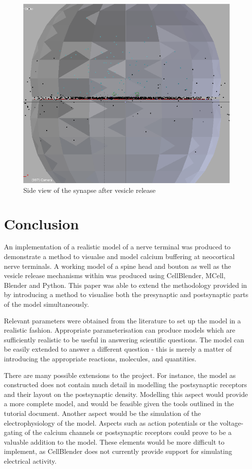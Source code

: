 \documentclass[a4paper]{article}
\begin{document}
\begin{figure}[H]
   \centering
   \includegraphics[scale = 0.4]{side_view.png} %
   \caption{Side view of the synapse after vesicle release}
   \label{fig3}
\end{figure}

\section{Conclusion}
An implementation of a realistic model of a nerve terminal was produced to demonstrate a method to visualse and model calcium buffering at neocortical nerve terminals. A working model of a spine head and bouton as well as the vesicle release mechanisms within was produced using CellBlender, MCell, Blender and Python. This paper was able to extend the methodology provided in \cite{Czech:MethodsMolBiol:2009} by introducing a method to visualise both the presynaptic and postsynaptic parts of the model simultaneously.

Relevant parameters were obtained from the literature to set up the model in a realistic fashion. Appropriate parameterisation can produce models which are sufficiently realistic to be useful in answering scientific questions. The model can be easily extended to answer a different question - this is merely a matter of introducing the appropriate reactions, molecules, and quantities.

There are many possible extensions to the project. For instance, the model as constructed does not contain much detail in modelling the postsynaptic receptors and their layout on the postsynaptic density. Modelling this aspect would provide a more complete model, and would be feasible given the tools outlined in the tutorial document. Another aspect would be the simulation of the electrophysiology of the model. Aspects such as action potentials or the voltage-gating of the calcium channels or postsynaptic receptors could prove to be a valuable addition to the model. These elements would be more difficult to implement, as CellBlender does not currently provide support for simulating electrical activity.
\end{document}
